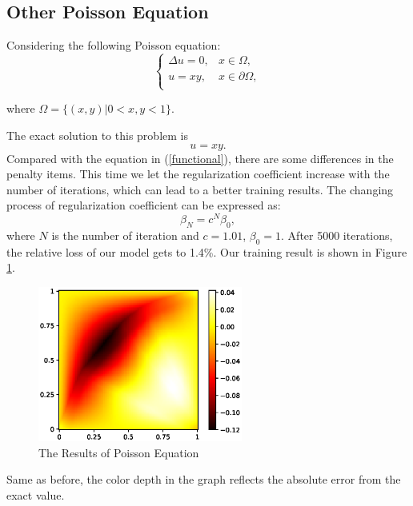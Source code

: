 \documentclass{article}
\begin{document}
\subsection{Other Poisson Equation}
\par Considering the following Poisson equation:
\begin{equation}
	\begin{cases}
		\Delta u=0, & x\in \Omega, \\
 		u=xy, & x\in \partial \Omega, \\
 	\end{cases}
\end{equation}

where $\Omega =\{(x,y)| 0<x,y<1\}$.
\par The exact solution to this problem is 
\begin{equation}
u=xy.
\end{equation}
Compared with the equation in (\ref{functional}), there are some differences in the penalty items. This time we let the regularization coefficient increase with the number of iterations, which can lead to a better training results. The changing process of regularization coefficient can be expressed as:
\begin{equation}
\beta_{N} = c^{N}\beta_{0},
\end{equation}
where $N$ is the number of iteration and $c = 1.01$, $\beta_0=1$. After 5000 iterations, the relative loss of our model gets to 1.4\%. Our training result is shown in Figure \ref{3.2a}.
\begin{figure}[ht]
 	 \centering
 	 \includegraphics[width=0.6\textwidth]{./images/loss_yubing.eps} 
	 \caption{The Results of Poisson Equation}
	 \label{3.2a}
\end{figure}

Same as before, the color depth in the graph reflects the absolute error from the exact value.
\end{document}
